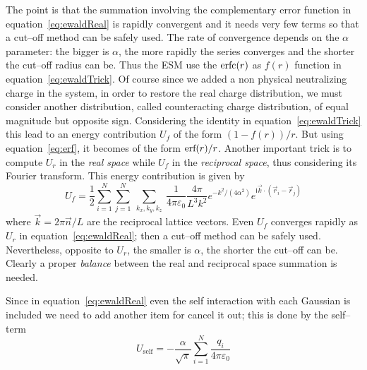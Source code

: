 The point is that the summation involving the complementary error function in equation~\eqref{eq:ewaldReal} is 
rapidly convergent and it needs very few terms so that a cut--off method can be safely used. The rate of 
convergence depends on the $\alpha$ parameter: the bigger is $\alpha$, the more rapidly the series converges and 
the shorter the cut--off radius can be. Thus the \ac{ESM} use the $\text{erfc}(r)$ as $f(r)$ function in 
equation~\eqref{eq:ewaldTrick}. Of course since we added a non physical neutralizing charge in the system, in 
order to restore the real charge distribution, we must consider another distribution, called counteracting charge 
distribution, of equal magnitude but opposite sign. Considering the identity in equation~\eqref{eq:ewaldTrick} 
this lead to an energy contribution $U_f$ of the form $(1-f(r))/r$. But using equation~\eqref{eq:erf}, it becomes 
of the form $\text{erf}(r)/r$. Another important trick is to compute $U_r$ in the \textit{real space} while $U_f$ in 
the \textit{reciprocal space}, thus considering its Fourier transform. This energy contribution is given by
\begin{equation}
	U_f = \frac{1}{2}\sum_{i=1}^N\sum_{j=1}^N\ \sum_{k_x,k_y,k_z}\ \frac{1}{4\pi\varepsilon_0}\frac{4\pi}{L^3k^2}e^{-k^2/(4\alpha^2)}e^{\mathsf{i}{\vec k \cdot (\vec r_i - \vec r_j)}}
	\label{eq:ewaldReciprocal}
\end{equation}
where $\vec k = 2\pi\vec n/L$ are the reciprocal lattice vectors. Even $U_f$ converges rapidly as $U_r$ in 
equation~\eqref{eq:ewaldReal}; then a cut--off method can be safely used. Nevertheless, opposite to $U_r$, the 
smaller is $\alpha$, the shorter the cut--off can be. Clearly a proper \textit{balance} between the real and 
reciprocal space summation is needed.

Since in equation~\eqref{eq:ewaldReal} even the self interaction with each Gaussian is included we need to add 
another item for cancel it out; this is done by the self--term
\begin{equation}
	U_\text{self} = -\frac{\alpha}{\sqrt{\pi}}\sum_{i=1}^N\frac{q_i}{4\pi\varepsilon_0}
	\label{eq:EwaldselfTerm}
\end{equation}

